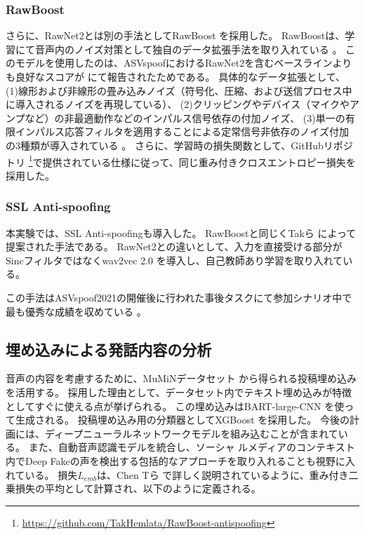 \subsubsection{RawBoost}
さらに、RawNet2とは別の手法としてRawBoost \cite{9746213}を採用した。
RawBoostは、学習にて音声内のノイズ対策として独自のデータ拡張手法を取り入れている \cite{9746213}。
このモデルを使用したのは、ASVspoofにおけるRawNet2を含むベースラインよりも良好なスコアが \cite{9746213}にて報告されたためである。
具体的なデータ拡張として、
(1)線形および非線形の畳み込みノイズ（符号化、圧縮、および送信プロセス中に導入されるノイズを再現している）、
(2)クリッピングやデバイス（マイクやアンプなど）の非最適動作などのインパルス信号依存の付加ノイズ、
(3)単一の有限インパルス応答フィルタを適用することによる定常信号非依存のノイズ付加
の3種類が導入されている \cite{9746213}。
さらに、学習時の損失関数として、GitHubリポジトリ \footnote{\url{https://github.com/TakHemlata/RawBoost-antispoofing}}で提供されている仕様に従って、同じ重み付きクロスエントロピー損失を採用した。

\subsubsection{SSL Anti-spoofing}
本実験では、SSL Anti-spoofingも導入した。
RawBoostと同じくTakら \cite{tak2022automatic}によって提案された手法である。
RawNet2との違いとして、入力を直接受ける部分がSincフィルタではなくwav2vec 2.0 \cite{NEURIPS2020_92d1e1eb}を導入し、自己教師あり学習を取り入れている。

この手法はASVspoof2021の開催後に行われた事後タスクにて参加シナリオ中で最も優秀な成績を収めている \cite{10155166}。

\subsection{埋め込みによる発話内容の分析}
音声の内容を考慮するために、MuMiNデータセット \cite{10.1145/3477495.3531744,NielsenMcConville2022}から得られる投稿埋め込みを活用する。
採用した理由として、データセット内でテキスト埋め込みが特徴としてすぐに使える点が挙げられる。
この埋め込みはBART-large-CNN \cite{lewis-etal-2020-bart}を使って生成される。
投稿埋め込み用の分類器としてXGBoost \cite{10.1145/2939672.2939785}を採用した。
今後の計画には、ディープニューラルネットワークモデルを組み込むことが含まれている。
また、自動音声認識モデルを統合し、ソーシャ ルメディアのコンテキスト内でDeep Fakeの声を検出する包括的なアプローチを取り入れることも視野に入れている。
損失$L_{emb}$は、Chen Tら \cite{10.1145/2939672.2939785}で詳しく説明されているように、重み付き二乗損失の平均として計算され、以下のように定義される。

